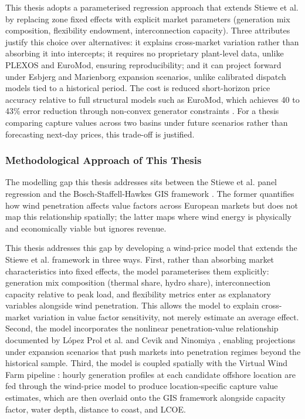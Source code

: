 This thesis adopts a parameterised regression approach that extends Stiewe et al. by replacing zone fixed effects with explicit market parameters (generation mix composition, flexibility endowment, interconnection capacity). Three attributes justify this choice over alternatives: it explains cross-market variation rather than absorbing it into intercepts; it requires no proprietary plant-level data, unlike PLEXOS and EuroMod, ensuring reproducibility; and it can project forward under Esbjerg and Marienborg expansion scenarios, unlike calibrated dispatch models tied to a historical period. The cost is reduced short-horizon price accuracy relative to full structural models such as EuroMod, which achieves 40 to 43\% error reduction through non-convex generator constraints \cite{Mendes2024}. For a thesis comparing capture values across two basins under future scenarios rather than forecasting next-day prices, this trade-off is justified.

\subsubsection{Methodological Approach of This Thesis}\label{sec:thesis_method}

The modelling gap this thesis addresses sits between the Stiewe et al. \cite{Stiewe2025} panel regression and the Bosch-Staffell-Hawkes GIS framework \cite{Bosch2017, Bosch2018, Bosch2019}. The former quantifies how wind penetration affects value factors across European markets but does not map this relationship spatially; the latter maps where wind energy is physically and economically viable but ignores revenue.

\vspace{4pt}

This thesis addresses this gap by developing a wind-price model that extends the Stiewe et al. framework in three ways. First, rather than absorbing market characteristics into fixed effects, the model parameterises them explicitly: generation mix composition (thermal share, hydro share), interconnection capacity relative to peak load, and flexibility metrics enter as explanatory variables alongside wind penetration. This allows the model to explain cross-market variation in value factor sensitivity, not merely estimate an average effect. Second, the model incorporates the nonlinear penetration-value relationship documented by L\'{o}pez Prol et al. \cite{LopezProl2024} and Cevik and Ninomiya \cite{Cevik2022}, enabling projections under expansion scenarios that push markets into penetration regimes beyond the historical sample. Third, the model is coupled spatially with the Virtual Wind Farm pipeline \cite{Staffell2016}: hourly generation profiles at each candidate offshore location are fed through the wind-price model to produce location-specific capture value estimates, which are then overlaid onto the GIS framework alongside capacity factor, water depth, distance to coast, and LCOE.

